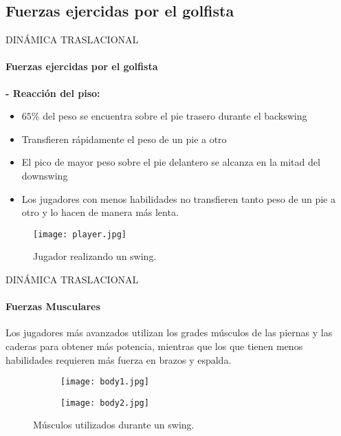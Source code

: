  \subsection{Fuerzas ejercidas por el golfista}
 \begin{frame}{DINÁMICA TRASLACIONAL}
 \framesubtitle{Fuerzas ejercidas por el golfista}
 \textbf{- Reacción del piso:}
 	\begin{itemize}
 	\item $65\%$ del peso se encuentra sobre el pie trasero durante el backswing
    \item Transfieren rápidamente el peso de un pie a otro 
    \item El pico de mayor peso sobre el pie delantero se alcanza en la mitad del downswing
    \item Los jugadores con menos habilidades no transfieren tanto peso de un pie a otro y lo hacen de manera más lenta.
 	\end{itemize}
    \begin{figure}[H]
      \centering
      \texttt{[image: player.jpg]}
      \caption{Jugador realizando un swing\footnotemark{}.}
     \end{figure}
     \vspace{-2cm}
\end{frame}
\begin{frame}{DINÁMICA TRASLACIONAL}
\framesubtitle{Fuerzas Musculares}
Los jugadores más avanzados utilizan los grades músculos de las piernas y las caderas para obtener más potencia, mientras que los que tienen menos habilidades requieren más fuerza en brazos y espalda.
\begin{figure}
  \centering
  \begin{subfigure}[H]{0.3\textwidth}
    \texttt{[image: body1.jpg]}
    \centering
  \end{subfigure}
  \hspace{-1cm} %
  \begin{subfigure}[H]{0.3\textwidth}
    \texttt{[image: body2.jpg]}
    \centering
  \end{subfigure} %
  \vspace{-2mm}
  \caption{Músculos utilizados durante un swing\footnotemark{}.}
\end{figure}
\end{frame}


